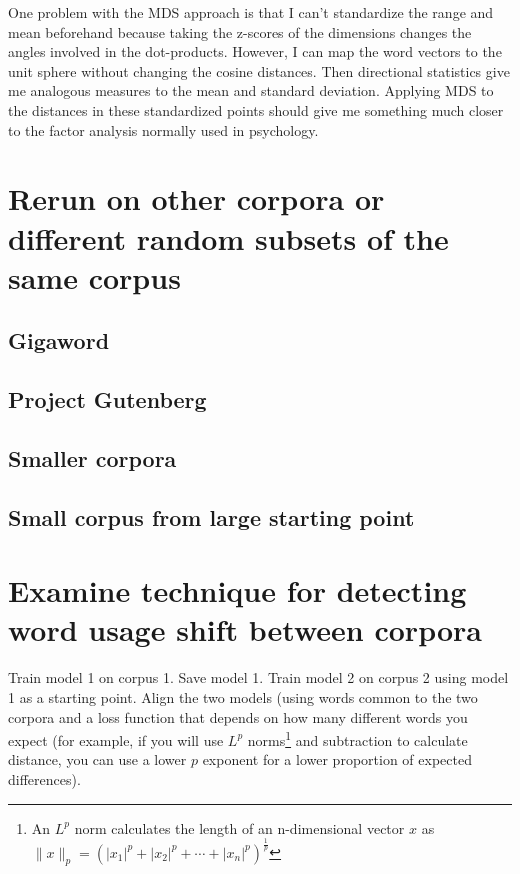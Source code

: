 \documentclass[eric_thesis.tex]{subfiles}
\begin{document}
One problem with the MDS approach is that I can't standardize the range and 
mean beforehand because taking the z-scores of the dimensions changes the 
angles involved in the dot-products. However, I can map the word vectors to 
the unit sphere without changing the cosine distances. Then directional 
statistics give me analogous measures to the mean and standard deviation. 
Applying MDS to the distances in these standardized points should give me 
something much closer to the factor analysis normally used in psychology.


\section{Rerun on other corpora or different random subsets of the same corpus}


\subsection{Gigaword}
\subsection{Project Gutenberg}
\subsection{Smaller corpora}
\subsection{Small corpus from large starting point}

\section{Examine technique for detecting word usage shift between corpora}

Train model 1 on corpus 1. Save model 1. Train model 2 on corpus 2 using model 1 as a starting point. Align the two models (using words common to the two corpora and a loss function that depends on how many different words you expect (for example, if you will use $L^p$ norms\footnote{An $L^p$ norm calculates the length of an n-dimensional vector $x$ as $\|x\|_p=\left(|x_1|^p+|x_2|^p+\dotsb+|x_n|^p\right)^{\frac{1}{p}}$} and subtraction to calculate distance, you can use a lower $p$ exponent for a lower proportion of expected differences).
\end{document}
